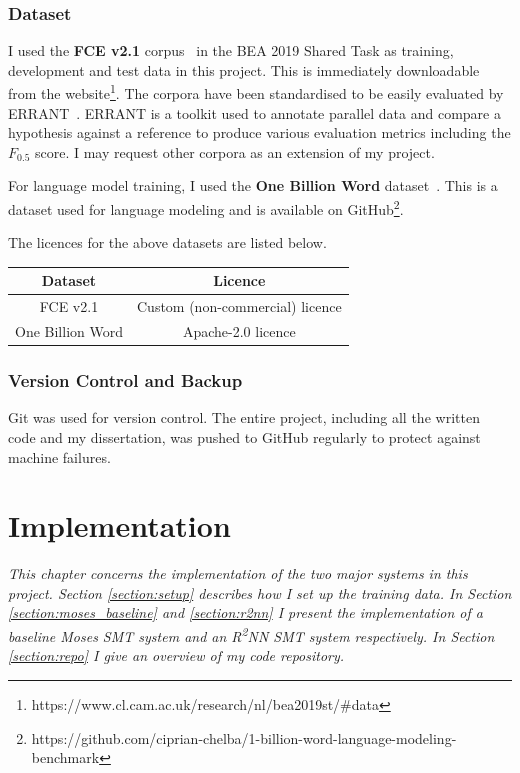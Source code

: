 \documentclass[12pt,a4paper,twoside]{report}
\begin{document}
\subsection{Dataset}
I used the \textbf{FCE v2.1} corpus~\cite{yannakoudakis-etal-2011-new} in the BEA 2019 Shared Task as training, development and test data in this project. This is immediately downloadable from the website\footnote{https://www.cl.cam.ac.uk/research/nl/bea2019st/\#data}. The corpora have been standardised to be easily evaluated by ERRANT~\cite{bryant-etal-2017-automatic, felice-etal-2016-automatic}. ERRANT is a toolkit used to annotate parallel data and compare a hypothesis against a reference to produce various evaluation metrics including the $F_{0.5}$ score. I may request other corpora as an extension of my project.

For language model training, I used the \textbf{One Billion Word} dataset~\cite{one-billion-word}. This is a dataset used for language modeling and is available on GitHub\footnote{https://github.com/ciprian-chelba/1-billion-word-language-modeling-benchmark}.

The licences for the above datasets are listed below.

\begin{center}
\vspace*{3mm}
\begin{tabular}{ c | c }
 \textbf{Dataset} & \textbf{Licence} \\
 \hline
 FCE v2.1 & Custom (non-commercial) licence \\
 One Billion Word & Apache-2.0 licence
\end{tabular}
\end{center}

\subsection{Version Control and Backup}
Git was used for version control. The entire project, including all the written code and my dissertation, was pushed to GitHub regularly to protect against machine failures.


\chapter{Implementation}
\textit{This chapter concerns the implementation of the two major systems in this project. Section \ref{section:setup} describes how I set up the training data. In Section \ref{section:moses_baseline} and \ref{section:r2nn} I present the implementation of a baseline Moses SMT system and an R\textsuperscript{2}NN SMT system respectively. In Section \ref{section:repo} I give an overview of my code repository.}
\end{document}
